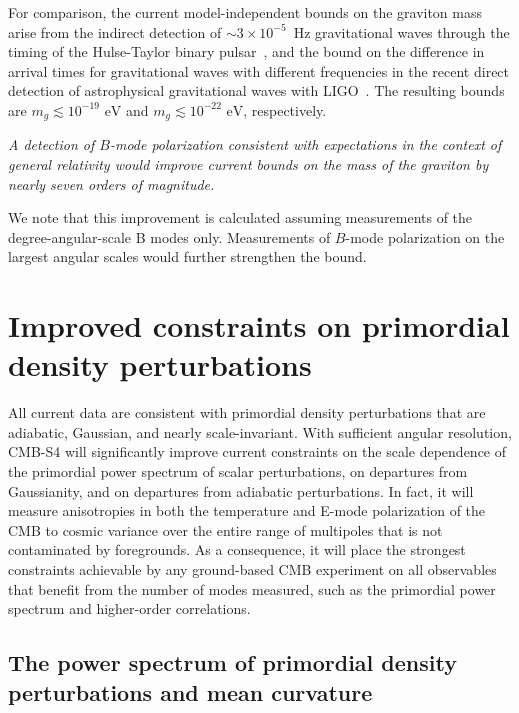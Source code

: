 For comparison, the current model-independent bounds on the graviton mass arise from the indirect detection of $\sim 3\times 10^{-5}$~Hz gravitational waves through the timing of the Hulse-Taylor binary pulsar~\cite{Finn:2001qi}, and the bound on the difference in arrival times for gravitational waves with different frequencies in the recent direct detection of astrophysical gravitational waves with LIGO~\cite{Abbott:2016blz}. The resulting bounds are $m_g\lesssim 10^{-19}{\mbox{ eV}}$ and $m_g\lesssim 10^{-22}{\mbox{ eV}}$, respectively. 

{\it A detection of $B$-mode polarization consistent with expectations in the context of general relativity would improve current bounds on the mass of the graviton by nearly seven orders of magnitude.} 

We note that this improvement is calculated assuming measurements of the degree-angular-scale B modes only. Measurements of $B$-mode polarization on the largest angular scales would further strengthen the bound. 



\section{Improved constraints on primordial density perturbations}
\label{sec:scalar}
All current data are consistent with primordial density perturbations that are adiabatic, Gaussian, and nearly scale-invariant. With sufficient angular resolution, CMB-S4 will significantly improve current constraints on the scale dependence of the primordial power spectrum of scalar perturbations, on departures from Gaussianity, and on departures from adiabatic perturbations. In fact, it will measure anisotropies in both the temperature and E-mode polarization of the CMB to cosmic variance over the entire range of multipoles that is not contaminated by foregrounds. As a consequence, it will place the strongest constraints achievable by any ground-based CMB experiment on all observables that benefit from the number of modes measured, such as the primordial power spectrum and higher-order correlations.

\subsection{The power spectrum of primordial density perturbations and mean curvature}

